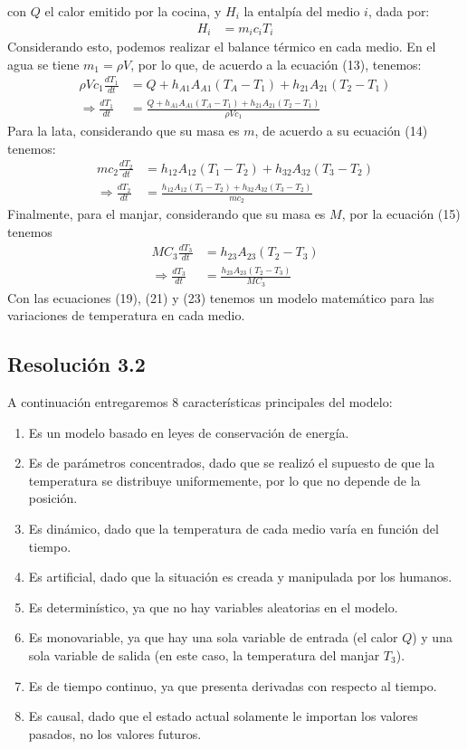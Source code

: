 \documentclass[
  11pt,
  letterpaper,
   addpoints,
   answers
  ]{exam}
\begin{document}
\begin{questions}
\begin{solution}
con $Q$ el calor emitido por la cocina, y $H_i$ la entalpía del medio $i$, dada por:
\begin{align}
    H_i &= m_i c_i T_i \tag{17}
    \end{align}
Considerando esto, podemos realizar el balance térmico en cada medio. En el agua se tiene $m_1 = \rho V$, por lo que, de acuerdo a la ecuación (13), tenemos:
\begin{align}
    \rho V c_1 \frac{dT_1}{dt} &= Q + h_{A1}A_{A1} (T_A - T_1) + h_{21}A_{21} (T_2 - T_1) \tag{18} \\
    \Rightarrow \frac{dT_1}{dt} &= \frac{Q + h_{A1}A_{A1} (T_A - T_1) + h_{21}A_{21} (T_2 - T_1)}{\rho V c_1} \tag{19}
    \end{align}
Para la lata, considerando que su masa es $m$, de acuerdo a su ecuación (14) tenemos:
\begin{align}
    mc_2 \frac{dT_2}{dt} &= h_{12}A_{12} (T_1 - T_2) + h_{32}A_{32} (T_3 - T_2) \tag{20} \\
    \Rightarrow \frac{dT_2}{dt} &= \frac{h_{12}A_{12} (T_1 - T_2) + h_{32}A_{32} (T_3 - T_2)}{mc_2} \tag{21}
\end{align}
Finalmente, para el manjar, considerando que su masa es $M$, por la ecuación (15) tenemos
\begin{align}
    MC_3 \frac{dT_3}{dt} &= h_{23}A_{23} (T_2 - T_3) \tag{22} \\
    \Rightarrow \frac{dT_3}{dt} &= \frac{h_{23}A_{23} (T_2 - T_3)}{MC_3} \tag{23}
\end{align}
Con las ecuaciones (19), (21) y (23) tenemos un modelo matemático para las variaciones de temperatura en cada medio.
\subsection*{Resolución 3.2}
A continuación entregaremos 8 características principales del modelo:
\begin{enumerate}
    \item Es un modelo basado en leyes de conservación de energía.
    \item Es de parámetros concentrados, dado que se realizó el supuesto de que la temperatura se distribuye uniformemente, por lo que no depende de la posición.
    \item Es dinámico, dado que la temperatura de cada medio varía en función del tiempo.
    \item Es artificial, dado que la situación es creada y manipulada por los humanos.
    \item Es determinístico, ya que no hay variables aleatorias en el modelo.
    \item Es monovariable, ya que hay una sola variable de entrada (el calor $Q$) y una sola variable de salida (en este caso, la temperatura del manjar $T_3$).
    \item Es de tiempo continuo, ya que presenta derivadas con respecto al tiempo.
    \item Es causal, dado que el estado actual solamente le importan los valores pasados, no los valores futuros.
\end{enumerate}


\end{solution}
\end{questions}
\end{document}
